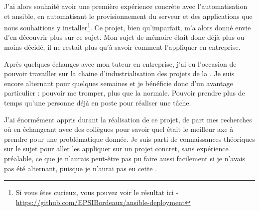 \clearpage

J'ai alors souhaité avoir une première expérience concrète avec l'automatisation et ansible, en automatisant le provisionnement du serveur et des applications que nous souhaitions y installer\footnote{Si vous êtes curieux, vous pouvez voir le résultat ici - \url{https://github.com/EPSIBordeaux/ansible-deployment}}. Ce projet, bien qu'imparfait, m'a alors donné envie d'en découvrir plus sur ce sujet. Mon sujet de mémoire était donc déjà plus ou moins décidé, il ne restait plus qu'à savoir comment l'appliquer en entreprise.

Après quelques échanges avec mon tuteur en entreprise, j'ai eu l'occasion de pouvoir travailler sur la chaine d'industrialisation des projets de la \naq. Je suis encore alternant pour quelques semaines et je bénéficie donc d'un avantage particulier : pouvoir me tromper, plus que la normale. Pouvoir prendre plus de temps qu'une personne déjà en poste pour réaliser une tâche.

J'ai énormément appris durant la réalisation de ce projet, de part mes recherches où en échangeant avec des collègues pour savoir quel était le meilleur axe à prendre pour une problématique donnée. Je suis parti de connaissances théoriques sur le sujet pour aller les appliquer sur un projet concret, sans expérience préalable, ce que je n'aurais peut-être pas pu faire aussi facilement si je n'avais pas été alternant, puisque je n'aurai pas eu cette .

